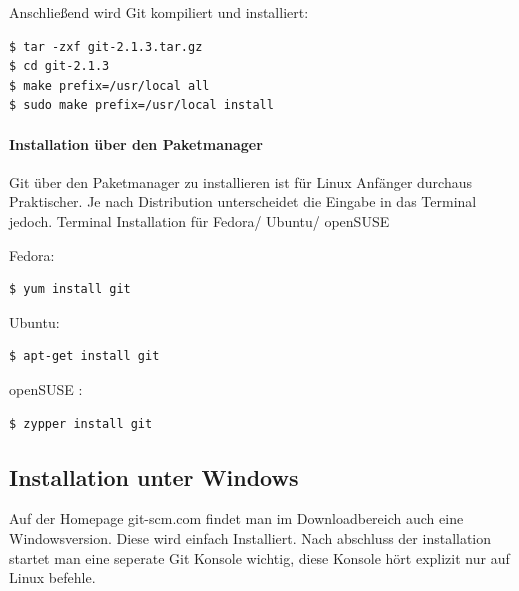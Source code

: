 \documentclass[12pt,a4paper,bibliography=totocnumbered,listof=totocnumbered]{scrartcl}
\begin{document}
Anschließend wird Git kompiliert und installiert:
\begin{lstlisting}
$ tar -zxf git-2.1.3.tar.gz
$ cd git-2.1.3
$ make prefix=/usr/local all
$ sudo make prefix=/usr/local install
 \end{lstlisting}

\paragraph{Installation über den Paketmanager}

Git über den Paketmanager zu installieren ist für Linux Anfänger durchaus Praktischer. Je nach Distribution unterscheidet die Eingabe in das Terminal jedoch.
\newpage
Terminal Installation für Fedora/ Ubuntu/ openSUSE 

Fedora:
\begin{lstlisting}
$ yum install git
 \end{lstlisting}

Ubuntu:
\begin{lstlisting}
$ apt-get install git
 \end{lstlisting}

openSUSE :
\begin{lstlisting}
$ zypper install git
 \end{lstlisting}



\subsection{Installation unter Windows}
Auf der Homepage git-scm.com findet man im Downloadbereich auch eine Windowsversion.
Diese wird einfach Installiert. Nach abschluss der installation startet man eine seperate Git Konsole wichtig, diese Konsole hört explizit nur auf Linux befehle. 
\end{document}
